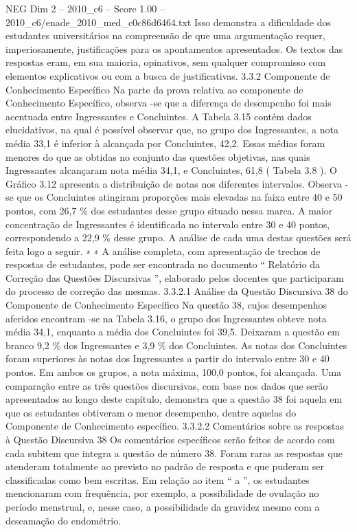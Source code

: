 \begin{textsample}{NEG Dim 2 – 2010\_c6 – Score 1.00 – 2010\_c6/enade\_2010\_med\_c0c86d6464.txt}
Isso demonstra a dificuldade dos estudantes universitários na compreensão de que uma argumentação requer, imperiosamente, justificações para os apontamentos apresentados.
Os textos das respostas eram, em sua maioria, opinativos, sem qualquer compromisso com elementos explicativos ou com a busca de justificativas. 3.3.2 Componente de Conhecimento Específico Na parte da prova relativa ao componente de Conhecimento Específico, observa -se que a diferença de desempenho foi mais acentuada entre Ingressantes e Concluintes.
A Tabela 3.15 contém dados elucidativos, na qual é possível observar que, no grupo dos Ingressantes, a nota média 33,1 é inferior à alcançada por Concluintes, 42,2.
Essas médias foram menores do que as obtidas no conjunto das questões objetivas, nas quais Ingressantes alcançaram nota média 34,1, e Concluintes, 61,8 ( Tabela 3.8 ).
O Gráfico 3.12 apresenta a distribuição de notas nos diferentes intervalos.
Observa -se que os Concluintes atingiram proporções mais elevadas na faixa entre 40 e 50 pontos, com 26,7 \% dos estudantes desse grupo situado nessa marca.
A maior concentração de Ingressantes é identificada no intervalo entre 30 e 40 pontos, correspondendo a 22,9 \% desse grupo.
A análise de cada uma destas questões será feita logo a seguir. ∗ ∗ A análise completa, com apresentação de trechos de respostas de estudantes, pode ser encontrada no documento “ Relatório da Correção das Questões Discursivas ”, elaborado pelos docentes que participaram do processo de correção das mesmas. 3.3.2.1 Análise da Questão Discursiva 38 do Componente de Conhecimento Específico Na questão 38, cujos desempenhos aferidos encontram -se na Tabela 3.16, o grupo dos Ingressantes obteve nota média 34,1, enquanto a média dos Concluintes foi 39,5.
Deixaram a questão em branco 9,2 \% dos Ingressantes e 3,9 \% dos Concluintes.
As notas dos Concluintes foram superiores às notas dos Ingressantes a partir do intervalo entre 30 e 40 pontos.
Em ambos os grupos, a nota máxima, 100,0 pontos, foi alcançada.
Uma comparação entre as três questões discursivas, com base nos dados que serão apresentados ao longo deste capítulo, demonstra que a questão 38 foi aquela em que os estudantes obtiveram o menor desempenho, dentre aquelas do Componente de Conhecimento específico. 3.3.2.2 Comentários sobre as respostas à Questão Discursiva 38 Os comentários específicos serão feitos de acordo com cada subitem que integra a questão de número 38.
Foram raras as respostas que atenderam totalmente ao previsto no padrão de resposta e que puderam ser classificadas como bem escritas.
Em relação ao item “ a ”, os estudantes mencionaram com frequência, por exemplo, a possibilidade de ovulação no período menstrual, e, nesse caso, a possibilidade da gravidez mesmo com a descamação do endométrio.

\end{textsample}
